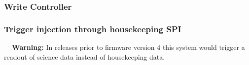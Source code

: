 \documentclass[a4paper,indent]{paper}
\newenvironment{warning}
{\par\begin{mdframed}[linewidth=2pt,linecolor=orange,backgroundcolor=orange!10]%
    \begin{list}{}{\leftmargin=0mm}\item[\bf\danger{}~~Warning: ]}
  {\end{list}\end{mdframed}\par}
\begin{document}
\subsubsection{Write Controller}
%
%
%
%
%
%
%
%



\subsubsection{Trigger injection through housekeeping \ac{SPI}}
\begin{warning}
  In releases prior to firmware version 4 this system would trigger a readout of science data instead of housekeeping data.
\end{warning}
\end{document}
